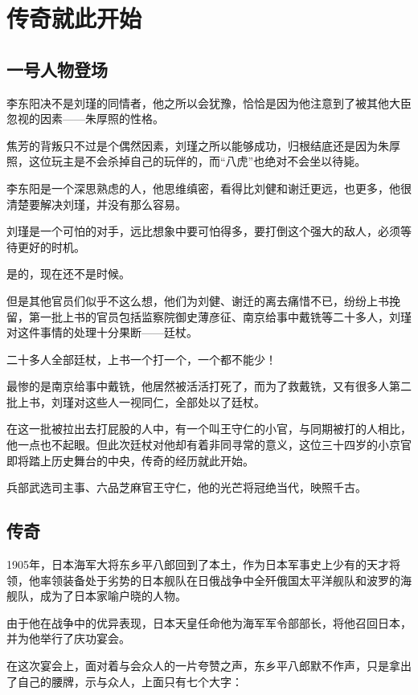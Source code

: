 \section{传奇就此开始}
\ifnum{}
	\begin{multicols}{\theparacolNo}
\fi
\subsection{一号人物登场}
李东阳决不是刘瑾的同情者，他之所以会犹豫，恰恰是因为他注意到了被其他大臣忽视的因素——朱厚照的性格。

焦芳的背叛只不过是个偶然因素，刘瑾之所以能够成功，归根结底还是因为朱厚照，这位玩主是不会杀掉自己的玩伴的，而“八虎”也绝对不会坐以待毙。

李东阳是一个深思熟虑的人，他思维缜密，看得比刘健和谢迁更远，也更多，他很清楚要解决刘瑾，并没有那么容易。

刘瑾是一个可怕的对手，远比想象中要可怕得多，要打倒这个强大的敌人，必须等待更好的时机。

是的，现在还不是时候。

但是其他官员们似乎不这么想，他们为刘健、谢迁的离去痛惜不已，纷纷上书挽留，第一批上书的官员包括监察院御史薄彦征、南京给事中戴铣等二十多人，刘瑾对这件事情的处理十分果断——廷杖。

二十多人全部廷杖，上书一个打一个，一个都不能少！

最惨的是南京给事中戴铣，他居然被活活打死了，而为了救戴铣，又有很多人第二批上书，刘瑾对这些人一视同仁，全部处以了廷杖。

在这一批被拉出去打屁股的人中，有一个叫王守仁的小官，与同期被打的人相比，他一点也不起眼。但此次廷杖对他却有着非同寻常的意义，这位三十四岁的小京官即将踏上历史舞台的中央，传奇的经历就此开始。

兵部武选司主事、六品芝麻官王守仁，他的光芒将冠绝当代，映照千古。

\subsection{传奇}
1905年，日本海军大将东乡平八郎回到了本土，作为日本军事史上少有的天才将领，他率领装备处于劣势的日本舰队在日俄战争中全歼俄国太平洋舰队和波罗的海舰队，成为了日本家喻户晓的人物。

由于他在战争中的优异表现，日本天皇任命他为海军军令部部长，将他召回日本，并为他举行了庆功宴会。

在这次宴会上，面对着与会众人的一片夸赞之声，东乡平八郎默不作声，只是拿出了自己的腰牌，示与众人，上面只有七个大字：


\end{multicols}
